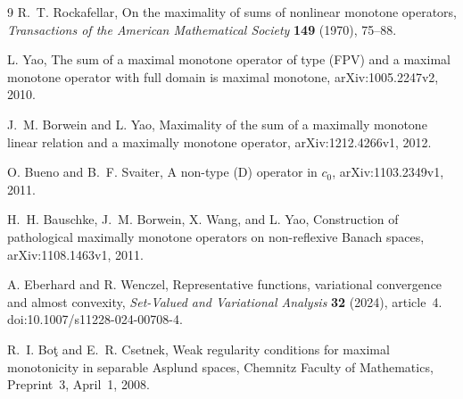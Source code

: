 \documentclass[11pt]{article}
\begin{document}
\begin{thebibliography}{9}
R.~T. Rockafellar,
On the maximality of sums of nonlinear monotone operators,
\emph{Transactions of the American Mathematical Society}
\textbf{149} (1970), 75--88.

L. Yao,
The sum of a maximal monotone operator of type (FPV) and a maximal
monotone operator with full domain is maximal monotone,
arXiv:1005.2247v2, 2010.

J.~M. Borwein and L. Yao,
Maximality of the sum of a maximally monotone linear relation and a
maximally monotone operator,
arXiv:1212.4266v1, 2012.

O. Bueno and B.~F. Svaiter,
A non-type (D) operator in $c_0$,
arXiv:1103.2349v1, 2011.

H.~H. Bauschke, J.~M. Borwein, X. Wang, and L. Yao,
Construction of pathological maximally monotone operators on
non-reflexive Banach spaces,
arXiv:1108.1463v1, 2011.

A. Eberhard and R. Wenczel,
Representative functions, variational convergence and almost convexity,
\emph{Set-Valued and Variational Analysis} \textbf{32} (2024), article~4.
doi:10.1007/s11228-024-00708-4.

R.~I. Bo\c{t} and E.~R. Csetnek,
Weak regularity conditions for maximal monotonicity in separable
Asplund spaces,
Chemnitz Faculty of Mathematics, Preprint~3, April~1, 2008.
\end{thebibliography}
\end{document}
